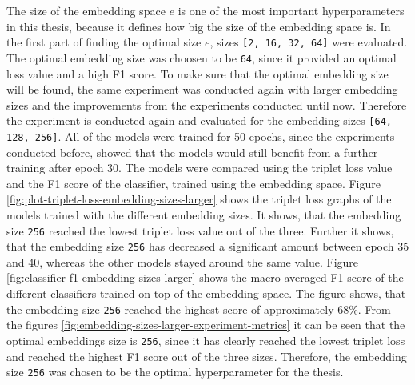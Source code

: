 \noindent
The size of the embedding space $e$ is one of the most important hyperparameters in this thesis, because it defines how big the size of the embedding space is. In the first part of finding the optimal size $e$, sizes \texttt{[2, 16, 32, 64]} were evaluated. The optimal embedding size was choosen to be \texttt{64}, since it provided an optimal loss value and a high F1 score. To make sure that the optimal embedding size will be found, the same experiment was conducted again with larger embedding sizes and the improvements from the experiments conducted until now. Therefore the experiment is conducted again and evaluated for the embedding sizes  \texttt{[64, 128, 256]}. All of the models were trained for 50 epochs, since the experiments conducted before, showed that the models would still benefit from a further training after epoch 30. The models were compared using the triplet loss value and the F1 score of the classifier, trained using the embedding space.
\newline
\newline
Figure \ref{fig:plot-triplet-loss-embedding-sizes-larger} shows the triplet loss graphs of the models trained with the different embedding sizes. It shows, that the embedding size \texttt{256} reached the lowest triplet loss value out of the three. Further it shows, that the embedding size \texttt{256} has decreased a significant amount between epoch 35 and 40, whereas the other models stayed around the same value. Figure \ref{fig:classifier-f1-embedding-sizes-larger} shows the macro-averaged F1 score of the different classifiers trained on top of the embedding space. The figure shows, that the embedding size \texttt{256} reached the highest score of approximately 68\%.
\newline
\newline
From the figures \ref{fig:embedding-sizes-larger-experiment-metrics} it can be seen that the optimal embeddings size is \texttt{256}, since it has clearly reached the lowest triplet loss and reached the highest F1 score out of the three sizes. Therefore, the embedding size \texttt{256} was chosen to be the optimal hyperparameter for the thesis.

